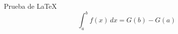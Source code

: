 \documentclass{article}
\begin{document}
	Prueba de \LaTeX
	\begin{equation}
		\int_a^b f(x)\,dx = G(b)-G(a)
	\end{equation}
\end{document}

